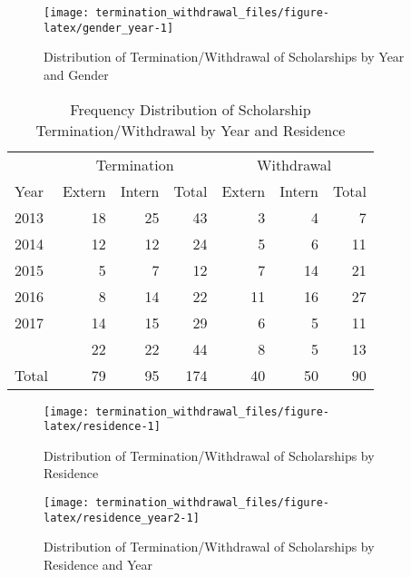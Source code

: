 \documentclass[a4paper]{article}
\begin{document}
\begin{figure}

{\centering \texttt{[image: termination\_withdrawal\_files/figure-latex/gender\_year-1]} 

}

\caption{\label{gender_year}Distribution of Termination/Withdrawal of Scholarships by Year and Gender}\label{fig:gender_year}
\end{figure}

\begin{table}

\caption{\label{tab:residence_year}\label{residence_year}Frequency Distribution of Scholarship Termination/Withdrawal by Year and Residence}
\centering
\begin{tabular}[t]{lrrrrrr}
\toprule
\multicolumn{1}{c}{ } & \multicolumn{3}{c}{Termination} & \multicolumn{3}{c}{Withdrawal} \\
\cmidrule(l{2pt}r{2pt}){2-4} \cmidrule(l{2pt}r{2pt}){5-7}
Year & Extern & Intern & Total & Extern & Intern & Total\\
\midrule
2013 & 18 & 25 & 43 & 3 & 4 & 7\\
2014 & 12 & 12 & 24 & 5 & 6 & 11\\
2015 & 5 & 7 & 12 & 7 & 14 & 21\\
2016 & 8 & 14 & 22 & 11 & 16 & 27\\
2017 & 14 & 15 & 29 & 6 & 5 & 11\\
\addlinespace
2018 & 22 & 22 & 44 & 8 & 5 & 13\\
Total & 79 & 95 & 174 & 40 & 50 & 90\\
\bottomrule
\end{tabular}
\end{table}

\begin{figure}

{\centering \texttt{[image: termination\_withdrawal\_files/figure-latex/residence-1]} 

}

\caption{\label{residence}Distribution of Termination/Withdrawal of Scholarships by Residence}\label{fig:residence}
\end{figure}

\begin{figure}

{\centering \texttt{[image: termination\_withdrawal\_files/figure-latex/residence\_year2-1]} 

}

\caption{\label{residence_year2}Distribution of Termination/Withdrawal of Scholarships by Residence and Year}\label{fig:residence_year2}
\end{figure}
\end{document}
